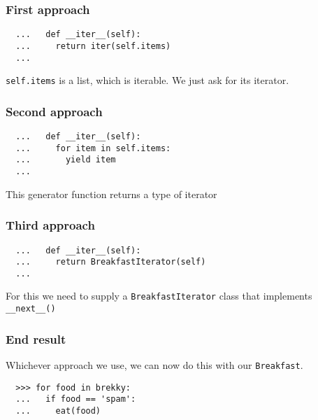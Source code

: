 \documentclass[aspectratio=169]{beamer}
\begin{document}
\begin{frame}[fragile]
  \frametitle{First approach}
  
  \begin{verbatim}
  ...   def __iter__(self):
  ...     return iter(self.items)
  ...
  \end{verbatim}
  \bigbreak
  
  \texttt{self.items} is a list, which is iterable. We just ask for its iterator.
 
  \end{frame}

\begin{frame}[fragile]
  \frametitle{Second approach}
  
  \begin{verbatim}
  ...   def __iter__(self):
  ...     for item in self.items:
  ...       yield item
  ...
  \end{verbatim}
  \bigbreak
  
  This generator function returns a type of iterator
 
  \end{frame}

\begin{frame}[fragile]
  \frametitle{Third approach}
  
  \begin{verbatim}
  ...   def __iter__(self):
  ...     return BreakfastIterator(self)
  ...
  \end{verbatim}
  \bigbreak
  
  For this we need to supply a \texttt{BreakfastIterator} class that implements
  \texttt{\_\_next\_\_()}
 
  \end{frame}

\begin{frame}[fragile]
  \frametitle{End result}
  
  Whichever approach we use, we can now do this with our \texttt{Breakfast}.
  
  \begin{verbatim}
  >>> for food in brekky:
  ...   if food == 'spam':
  ...     eat(food)
  \end{verbatim}
   
  \end{frame}
\end{document}
